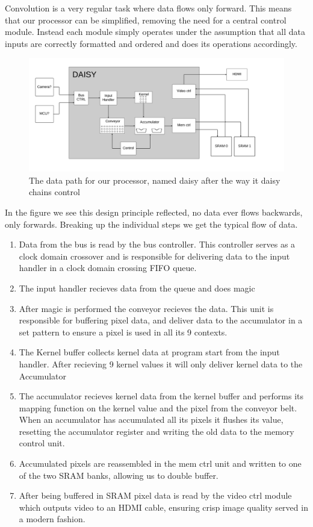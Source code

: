 Convolution is a very regular task where data flows only forward. This means that our processor can be simplified, removing the need for a central control module.
Instead each module simply operates under the assumption that all data inputs are correctly formatted and ordered and does its operations accordingly.
\begin{figure}[h!]
    \includegraphics[width=\linewidth]{img/DataPath.png}
    \caption{The data path for our processor, named daisy after the way it daisy chains control}
    \label{fig:Convolution}
\end{figure}
In the figure we see this design principle reflected, no data ever flows backwards, only forwards. 
Breaking up the individual steps we get the typical flow of data.
\begin{enumerate}
  \item Data from the bus is read by the bus controller. This controller serves as a clock domain crossover and is responsible for delivering data to the input handler in a clock domain crossing FIFO queue.
  \item The input handler recieves data from the queue and does magic
  \item After magic is performed the conveyor recieves the data. This unit is responsible for buffering pixel data, and deliver data to the accumulator in a set pattern to ensure a pixel is used in all its 9 contexts.
  \item The Kernel buffer collects kernel data at program start from the input handler. After recieving 9 kernel values it will only deliver kernel data to the Accumulator
  \item The accumulator recieves kernel data from the kernel buffer and performs its mapping function on the kernel value and the pixel from the conveyor belt. 
When an accumulator has accumulated all its pixels it flushes its value, resetting the accumulator register and writing the old data to the memory control unit.
  \item Accumulated pixels are reassembled in the mem ctrl unit and written to one of the two SRAM banks, allowing us to double buffer. 
  \item After being buffered in SRAM pixel data is read by the video ctrl module which outputs video to an HDMI cable, ensuring crisp image quality served in a modern fashion.
\end{enumerate}

